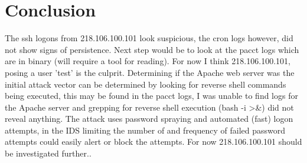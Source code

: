\documentclass[
	letterpaper, %
	10pt, %
	unnumberedsections, %
	twoside, %
]{APAAssignment}
\begin{document}
\section{Conclusion}
The ssh logons from 218.106.100.101 look suspicious, the cron logs however, did not show signs of persistence. Next step would be to look at the pacct logs which are in binary (will require a tool for reading). For now I think 218.106.100.101, posing a user 'test' is the culprit. Determining if the Apache web server was the initial attack vector can be determined by looking for reverse shell commands being executed, this may be found in the pacct logs, I was unable to find logs for the Apache server and grepping for reverse shell execution (bash -i >&) did not reveal anything. The attack uses password spraying and automated (fast) logon attempts, in the IDS limiting the number of and frequency of failed password attempts could easily alert or block the attempts. For now 218.106.100.101 should be investigated further..



\printbibliography %




%


\clearpage
\end{document}
